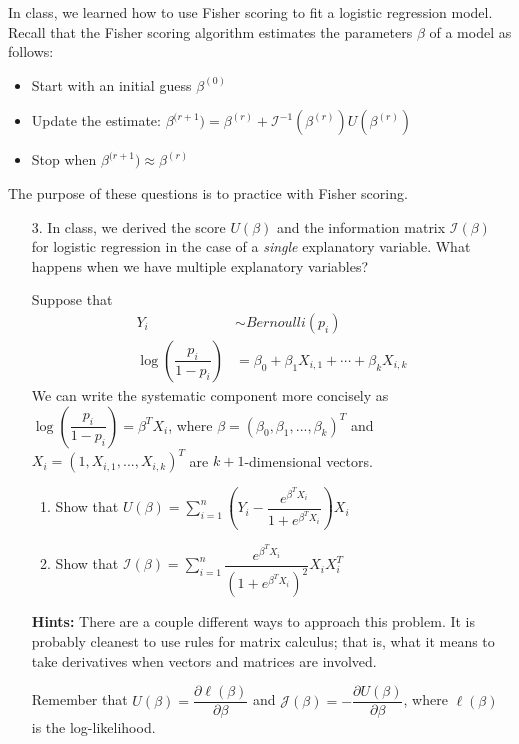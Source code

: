 \documentclass[11pt]{article}
\begin{document}
In class, we learned how to use Fisher scoring to fit a logistic regression model. Recall that the Fisher scoring algorithm estimates the parameters $\beta$ of a model as follows:

\begin{itemize}
\item Start with an initial guess $\beta^{(0)}$
\item Update the estimate: $\beta^{(r+1}) = \beta^{(r)} + \mathcal{I}^{-1}(\beta^{(r)}) U(\beta^{(r)})$
\item Stop when $\beta^{(r+1}) \approx \beta^{(r)}$
\end{itemize}

\noindent The purpose of these questions is to practice with Fisher scoring.\\

\begin{enumerate}
\item[3.] In class, we derived the score $U(\beta)$ and the information matrix $\mathcal{I}(\beta)$ for logistic regression in the case of a \textit{single} explanatory variable. What happens when we have multiple explanatory variables?

Suppose that
\begin{align*}
Y_i &\sim Bernoulli(p_i)\\
\log \left( \dfrac{p_i}{1 - p_i} \right) &= \beta_0 + \beta_1 X_{i,1} + \cdots + \beta_k X_{i,k}
\end{align*}
We can write the systematic component more concisely as $\log \left( \dfrac{p_i}{1 - p_i} \right) = \beta^T X_i$, where $\beta = (\beta_0, \beta_1, ..., \beta_k)^T$ and $X_i = (1, X_{i,1}, ..., X_{i,k})^T$ are $k+1$-dimensional vectors.

\begin{enumerate}
\item Show that $U(\beta) = \sum \limits_{i=1}^n \left( Y_i - \dfrac{e^{\beta^T X_i}}{1 + e^{\beta^T X_i}} \right) X_i$
\item Show that $\mathcal{I}(\beta) = \sum \limits_{i=1}^n \dfrac{e^{\beta^T X_i}}{(1 + e^{\beta^T X_i})^2} X_i X_i^T$
\end{enumerate}

\textbf{Hints:} There are a couple different ways to approach this problem. It is probably cleanest to use rules for matrix calculus; that is, what it means to take derivatives when vectors and matrices are involved. 

Remember that $U(\beta) = \dfrac{\partial \ell(\beta)}{\partial \beta}$ and $\mathcal{J}(\beta) = -\dfrac{\partial U(\beta)}{\partial \beta}$, where $\ell(\beta)$ is the log-likelihood.


\end{enumerate}
\end{document}
